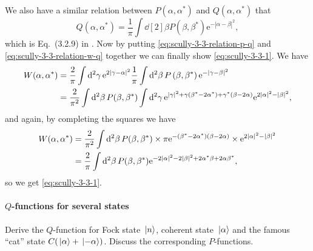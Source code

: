\documentclass[hyperref, a4paper]{article}
\newcommand*{\ee}{\mathrm{e}}
\begin{document}
We also have a similar relation between $P(\alpha, \alpha^*)$ and $Q(\alpha, \alpha^*)$ that
\begin{equation}
    Q\left(\alpha, \alpha^{*}\right)= \frac{1}{\pi} \int \dd[2]{\beta} P\left(\beta, \beta^{*}\right) \ee^{-|\alpha-\beta|^{2}},
    \label{eq:scully-3-3-relation-p-q}
\end{equation}
which is Eq.~(3.2.9) in \cite{Scully1997}.  
Now by putting \eqref{eq:scully-3-3-relation-p-q} and \eqref{eq:scully-3-3-relation-w-q} together we can finally show \eqref{eq:scully-3-3-1}.
We have
\[
    \begin{aligned}
        W(\alpha, \alpha^*) &= \frac{2}{\pi} \int \dd[2]{\gamma} \ee^{2 \abs{\gamma - \alpha}^2} \frac{1}{\pi} \int \dd[2]{\beta} P\left(\beta, \beta^{*}\right) \ee^{-|\gamma-\beta|^{2}} \\
        &= \frac{2}{\pi^2} \int \dd[2]{\beta} P(\beta, \beta^*) \int \dd[2]{\gamma} \ee^{\abs*{\gamma}^2 + \gamma(\beta^* - 2 \alpha^*) + \gamma^* (\beta - 2\alpha) } \ee^{2\abs*{\alpha}^2 - \abs*{\beta}^2  } ,
    \end{aligned}
\]
and again, by completing the squares we have 
\[
    \begin{aligned}
        W(\alpha, \alpha^*) &= \frac{2}{\pi^2} \int \dd[2]{\beta} P(\beta, \beta^*) \times \pi \ee^{- (\beta^* - 2\alpha^*) (\beta - 2\alpha)} \times \ee^{2\abs*{\alpha}^2 - \abs*{\beta}^2  } \\
        &= \frac{2}{\pi} \int \dd[2]{\beta} P(\beta, \beta^*) \ee^{- 2 \abs*{\alpha}^2 - 2 \abs*{\beta}^2 + 2 \alpha^* \beta + 2 \alpha \beta^*} ,
    \end{aligned}
\]
so we get \eqref{eq:scully-3-3-1}.

\paragraph{$Q$-functions for several states} Derive the $Q$-function for Fock state $\ket*{n}$, coherent state $\ket*{\alpha}$ and the famous ``cat'' state $C (\ket*{\alpha} + \ket*{-\alpha})$. Discuss the corresponding $P$-functions.
\end{document}
